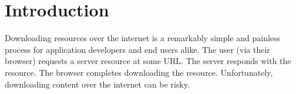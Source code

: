 \section{Introduction} \label{sec:introduction}

Downloading resources over the internet is a remarkably simple and painless
process for application developers and end users alike. The user (via their
browser) requests a server resource at some URL. The server responds with the
resource. The browser completes downloading the resource. Unfortunately,
downloading content over the internet can be risky.

